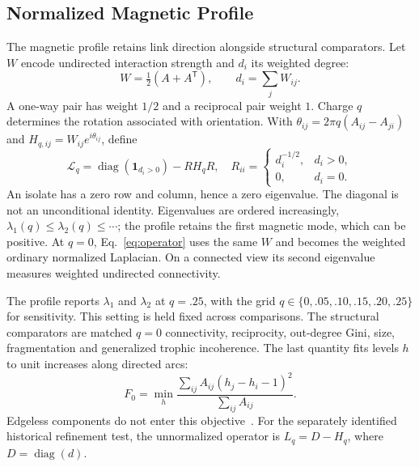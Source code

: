 \subsection{Normalized Magnetic Profile}
\label{sec:magnetic-profile}
The magnetic profile retains link direction alongside structural comparators.
Let $W$ encode undirected interaction strength and $d_i$ its weighted degree:
\begin{equation}
 W=\tfrac12(A+A^{\mathsf T}),\qquad d_i=\sum_j W_{ij}.
\end{equation}
A one-way pair has weight $1/2$ and a reciprocal pair weight $1$.
Charge $q$ determines the rotation associated with orientation. With
$\theta_{ij}=2\pi q(A_{ij}-A_{ji})$ and
$H_{q,ij}=W_{ij}e^{i\theta_{ij}}$, define
\begin{equation}
 \mathcal L_q=\operatorname{diag}(\mathbf1_{d_i>0})-R H_q R,
 \quad R_{ii}=\begin{cases}d_i^{-1/2},&d_i>0,\\0,&d_i=0.\end{cases}
 \label{eq:operator}
\end{equation}
An isolate has a zero row and column, hence a zero eigenvalue. The diagonal is
not an unconditional identity. Eigenvalues are ordered increasingly,
$\lambda_1(q)\leq\lambda_2(q)\leq\cdots$; the profile retains the first magnetic
mode, which can be positive. At $q=0$, Eq.~\ref{eq:operator} uses the same $W$ and
becomes the weighted ordinary normalized Laplacian. On a connected view its
second eigenvalue measures weighted undirected connectivity.

The profile reports $\lambda_1$ and $\lambda_2$ at $q=.25$, with the grid
$q\in\{0,.05,.10,.15,.20,.25\}$ for sensitivity. This setting is held fixed
across comparisons. The structural comparators are matched $q=0$ connectivity, reciprocity,
out-degree Gini, size, fragmentation and generalized trophic incoherence.
The last quantity fits levels $h$ to unit increases along directed arcs:
\begin{equation}
 F_0=\min_h\frac{\sum_{ij}A_{ij}(h_j-h_i-1)^2}{\sum_{ij}A_{ij}}.
 \label{eq:trophic}
\end{equation}
Edgeless components do not enter this objective~\cite{mackay2020}.
For the separately identified historical refinement
test, the unnormalized operator is $L_q=D-H_q$, where $D=\operatorname{diag}(d)$.


